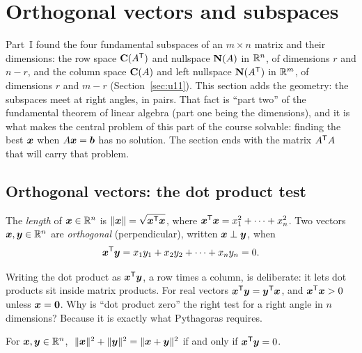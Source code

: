 \section{Orthogonal vectors and subspaces}\label{sec:u16}

Part~I found the four fundamental subspaces of an $m\times n$ matrix and their dimensions:
the row space $\mathbf{C}(A^{\mathsf{T}})$ and nullspace $\mathbf{N}(A)$ in $\mathbb{R}^n$, of dimensions $r$ and $n-r$, and
the column space $\mathbf{C}(A)$ and left nullspace $\mathbf{N}(A^{\mathsf{T}})$ in $\mathbb{R}^m$, of dimensions $r$ and
$m-r$ (Section~\ref{sec:u11}). This section adds the geometry: the subspaces meet at right
angles, in pairs. That fact is ``part two'' of the fundamental theorem of linear algebra
(part one being the dimensions), and it is what makes the central problem of this part of the
course solvable: finding the best $\boldsymbol{x}$ when $A\boldsymbol{x}=\boldsymbol{b}$ has no solution. The
section ends with the matrix $A^{\mathsf{T}} A$ that will carry that problem.

\subsection{Orthogonal vectors: the dot product test}

\begin{definition}\label{def:u16-orth}
The \emph{length} of $\boldsymbol{x}\in\mathbb{R}^n$ is $\|\boldsymbol{x}\|=\sqrt{\boldsymbol{x}^{\mathsf{T}}\boldsymbol{x}}$, where
$\boldsymbol{x}^{\mathsf{T}}\boldsymbol{x}=x_1^2+\cdots+x_n^2$. Two vectors $\boldsymbol{x},\boldsymbol{y}\in\mathbb{R}^n$ are
\emph{orthogonal} (perpendicular), written $\boldsymbol{x}\perp\boldsymbol{y}$, when
\[
  \boldsymbol{x}^{\mathsf{T}}\boldsymbol{y}=x_1y_1+x_2y_2+\cdots+x_ny_n=0 .
\]
\end{definition}

Writing the dot product as $\boldsymbol{x}^{\mathsf{T}}\boldsymbol{y}$, a row times a column, is deliberate: it lets
dot products sit inside matrix products. For real vectors $\boldsymbol{x}^{\mathsf{T}}\boldsymbol{y}=\boldsymbol{y}^{\mathsf{T}}\boldsymbol{x}$,
and $\boldsymbol{x}^{\mathsf{T}}\boldsymbol{x}>0$ unless $\boldsymbol{x}=\boldsymbol{0}$. Why is ``dot product zero'' the right test for a
right angle in $n$ dimensions? Because it is exactly what Pythagoras requires.

\begin{proposition}[Pythagoras]\label{prop:u16-pythagoras}
For $\boldsymbol{x},\boldsymbol{y}\in\mathbb{R}^n$,
$\ \|\vb{x}\|^2+\|\vb{y}\|^2=\|\vb{x}+\vb{y}\|^2$ if and only if $\boldsymbol{x}^{\mathsf{T}}\boldsymbol{y}=0$.
\end{proposition}

